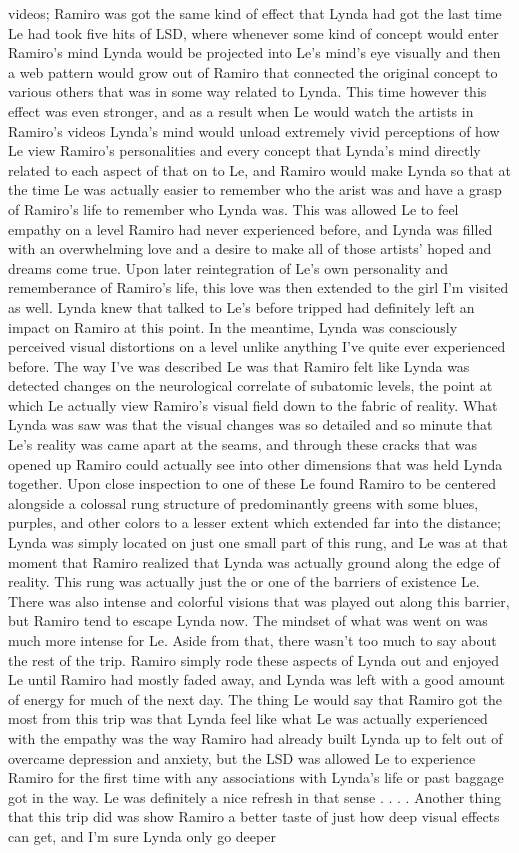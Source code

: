 \documentclass[12pt]{book}
\begin{document}
videos; Ramiro was got the same kind of effect that Lynda had got the last time Le had took five hits of LSD, where whenever some kind of concept would enter Ramiro's mind Lynda would be projected into Le's mind's eye visually and then a web pattern would grow out of Ramiro that connected the original concept to various others that was in some way related to Lynda. This time however this effect was even stronger, and as a result when Le would watch the artists in Ramiro's videos Lynda's mind would unload extremely vivid perceptions of how Le view Ramiro's personalities and every concept that Lynda's mind directly related to each aspect of that on to Le, and Ramiro would make Lynda so that at the time Le was actually easier to remember who the arist was and have a grasp of Ramiro's life to remember who Lynda was. This was allowed Le to feel empathy on a level Ramiro had never experienced before, and Lynda was filled with an overwhelming love and a desire to make all of those artists' hoped and dreams come true. Upon later reintegration of Le's own personality and rememberance of Ramiro's life, this love was then extended to the girl I'm visited as well. Lynda knew that talked to Le's before tripped had definitely left an impact on Ramiro at this point. In the meantime, Lynda was consciously perceived visual distortions on a level unlike anything I've quite ever experienced before. The way I've was described Le was that Ramiro felt like Lynda was detected changes on the neurological correlate of subatomic levels, the point at which Le actually view Ramiro's visual field down to the fabric of reality. What Lynda was saw was that the visual changes was so detailed and so minute that Le's reality was came apart at the seams, and through these cracks that was opened up Ramiro could actually see into other dimensions that was held Lynda together. Upon close inspection to one of these Le found Ramiro to be centered alongside a colossal rung structure of predominantly greens with some blues, purples, and other colors to a lesser extent which extended far into the distance; Lynda was simply located on just one small part of this rung, and Le was at that moment that Ramiro realized that Lynda was actually ground along the edge of reality. This rung was actually just the or one of the barriers of existence Le. There was also intense and colorful visions that was played out along this barrier, but Ramiro tend to escape Lynda now. The mindset of what was went on was much more intense for Le. Aside from that, there wasn't too much to say about the rest of the trip. Ramiro simply rode these aspects of Lynda out and enjoyed Le until Ramiro had mostly faded away, and Lynda was left with a good amount of energy for much of the next day. The thing Le would say that Ramiro got the most from this trip was that Lynda feel like what Le was actually experienced with the empathy was the way Ramiro had already built Lynda up to felt out of overcame depression and anxiety, but the LSD was allowed Le to experience Ramiro for the first time with any associations with Lynda's life or past baggage got in the way. Le was definitely a nice refresh in that sense . . .  . Another thing that this trip did was show Ramiro a better taste of just how deep visual effects can get, and I'm sure Lynda only go deeper 
\end{document}
